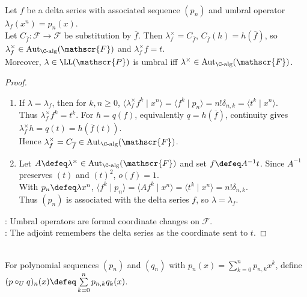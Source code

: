 \begin{theorem} \label{thm:umbral-operators-automorphisms-composition} \\
Let $f$ be a delta series with associated sequence $(p_n)$ and umbral operator $\lambda_f(x^n)=p_n(x)$.\\
Let $C_{\overline f}:\mathscr{F}\to\mathscr{F}$ be substitution by $\overline f$. Then $\lambda_f^\times=C_{\overline f}$, $C_{\overline f}(h)=h(\overline f)$, so $\lambda_f^\times\in\operatorname{Aut}_{\C\text{-alg}}(\mathscr{F})$ and $\lambda_f^\times f=t$.\\
Moreover, $\lambda\in\LL(\mathscr{P})$ is umbral iff $\lambda^\times\in\operatorname{Aut}_{\C\text{-alg}}(\mathscr{F})$.
\begin{proof}
\begin{enumerate}[label=\roman*.]
\setlength{\itemsep}{0pt}
\item[$(\Rightarrow)$] If $\lambda=\lambda_f$, then for $k,n\geq0$, $\langle \lambda_f^\times f^k\mid x^n\rangle =\langle f^k\mid p_n\rangle =n!\delta_{n,k} =\langle t^k\mid x^n\rangle$.\\
Thus $\lambda_f^\times f^k=t^k$. For $h=q(f)$, equivalently $q=h(\overline f)$, continuity gives $\lambda_f^\times h=q(t)=h(\overline f(t))$.\\
Hence $\lambda_f^\times=C_{\overline f}\in \operatorname{Aut}_{\C\text{-alg}}(\mathscr{F})$.
\item[$(\Leftarrow)$] Let $A\defeq\lambda^\times\in \operatorname{Aut}_{\C\text{-alg}}(\mathscr{F})$ and set $f\defeq A^{-1}t$. Since $A^{-1}$ preserves $(t)$ and $(t)^2$, $o(f)=1$.\\
With $p_n\defeq\lambda x^n$, $\langle f^k\mid p_n\rangle =\langle A f^k\mid x^n\rangle =\langle t^k\mid x^n\rangle =n!\delta_{n,k}$.\\
Thus $(p_n)$ is associated with the delta series $f$, so $\lambda=\lambda_f$.
\end{enumerate}
: Umbral operators are formal coordinate changes on $\mathscr{F}$.\\
: The adjoint remembers the delta series as the coordinate sent to $t$.
\end{proof}
\end{theorem}

\begin{definition} \label{def:umbral-composition-associated-sequences} \\
For polynomial sequences $(p_n)$ and $(q_n)$ with $p_n(x)=\sum_{k=0}^{n}p_{n,k}x^k$, define $(p\circ_U q)_n(x)\defeq\sum\limits_{k=0}^{n}p_{n,k}q_k(x)$.
\end{definition}

